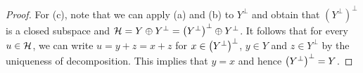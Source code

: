 \begin{proof}
    For (c), note that we can apply (a) and (b) to $Y^\perp$ and obtain that 
    $(Y^\perp)^\perp$ is a closed subspace and $\H = Y\oplus Y^\perp 
    = \pth{Y^\perp}^\perp\oplus Y^\perp$. It follows that for every $u\in\mathcal{H}$, 
    we can write $u = y + z = x + z$ for $x\in \pth{Y^\perp}^\perp$, 
    $y\in Y$ and $z\in Y^\perp$ by the uniqueness of decomposition. This 
    implies that $y = x$ and hence $\pth{Y^\perp}^\perp = Y$.
\end{proof}

